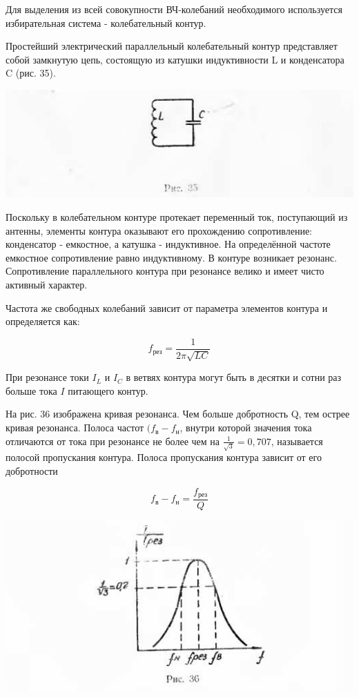\documentclass[12pt]{article}
\begin{document}
Для выделения из всей совокупности ВЧ-колебаний необходимого используется избирательная система - колебательный контур.

Простейший электрический параллельный колебательный контур представляет собой замкнутую цепь, состоящую из катушки индуктивности L и конденсатора C (рис. 35).

\includegraphics[scale=0.85]{ekon3_031_1}

Поскольку в колебательном контуре протекает переменный ток, поступающий из антенны, элементы контура оказывают его прохождению сопротивление: конденсатор - емкостное, а катушка - индуктивное. На определённой частоте емкостное сопротивление равно индуктивному. В контуре возникает резонанс. Сопротивление параллельного контура при резонансе велико и имеет чисто активный характер.

\newpage

Частота же свободных колебаний зависит от параметра элементов контура и определяется как:

\begin{equation}
f_{\text{рез}} = \frac{1}{2 \pi \sqrt{LC}}
\end{equation}

При резонансе токи $I_L$ и $I_C$ в ветвях контура могут быть в десятки и сотни раз больше тока $I$ питающего контур.

На рис. 36 изображена кривая резонанса. Чем больше добротность Q, тем острее кривая резонанса. Полоса частот $(f_\text{в} - f_\text{н}$, внутри которой значения тока отличаются от тока при резонансе не более чем на $\frac{1}{\sqrt{3}} = 0,707$, называется полосой пропускания контура. Полоса пропускания контура зависит от его добротности

\begin{equation}
 f_{\text{в}} - f_{\text{н}} = \frac{f_{\text{рез}}}{Q}
\end{equation}

\includegraphics[scale=0.85]{ekon3_032_1}
\end{document}
